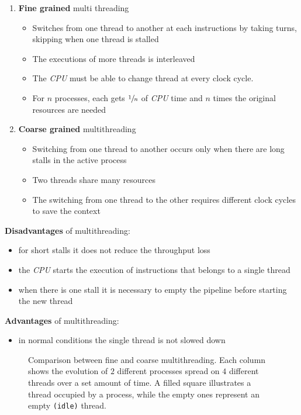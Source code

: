 \documentclass[english]{article}
\begin{document}
\begin{enumerate}
  \item \textbf{Fine grained} multi threading
        \begin{itemize}
          \item Switches from one thread to another at each instructions by taking turns, skipping when one thread is stalled
          \item The executions of more threads is interleaved
          \item The \textit{CPU} must be able to change thread at every clock cycle.
          \item For \(n\) processes, each gets \(\sfrac{1}{n}\) of \textit{CPU} time and \(n\) times the original resources are needed
        \end{itemize}
  \item \textbf{Coarse grained} multithreading
        \begin{itemize}
          \item Switching from one thread to another occurs only when there are long stalls in the active process
          \item Two threads share many resources
          \item The switching from one thread to the other requires different clock cycles to save the context
        \end{itemize}
\end{enumerate}

\bigskip

\textbf{Disadvantages} of multithreading:
\begin{itemize}
  \item for short stalls it does not reduce the throughput loss
  \item the \textit{CPU} starts the execution of instructions that belongs to a single thread
  \item when there is one stall it is necessary to empty the pipeline before starting the new thread
\end{itemize}

\textbf{Advantages} of multithreading:
\begin{itemize}
  \item in normal conditions the single thread is not slowed down
\end{itemize}

\begin{figure}[htbp]
  \bigskip
  \centering
  \caption{\centering Comparison between fine and coarse multithreading. Each column shows the evolution of \(2\) different processes spread on \(4\) different threads over a set amount of time.
    A filled square illustrates a thread occupied by a process, while the empty ones represent an empty \texttt{(idle)} thread.}
  \label{fig:multithreading-fine-coarse-comparison}
  \bigskip
\end{figure}
\end{document}
